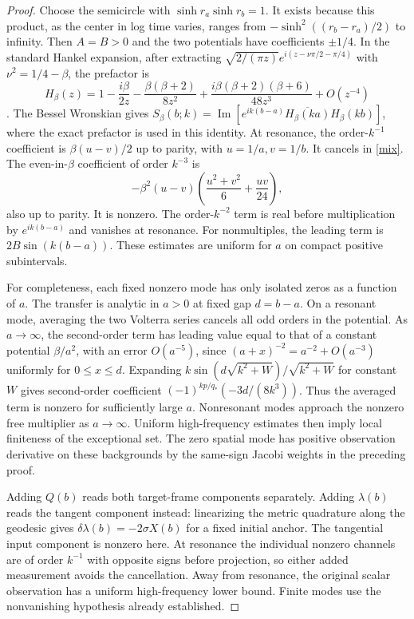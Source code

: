 \documentclass[11pt]{article}
\begin{document}
\begin{proof}
Choose the semicircle with $\sinh r_a\sinh r_b=1$.
It exists because this product, as the center in log time varies,
ranges from $-\sinh^2((r_b-r_a)/2)$ to infinity.
Then $A=B>0$ and the two potentials have coefficients $\pm1/4$.
In the standard Hankel expansion, after extracting
$\sqrt{2/(\pi z)}e^{i(z-\nu\pi/2-\pi/4)}$ with
$\nu^2=1/4-\beta$, the prefactor is
\[
 H_\beta(z)
 =1-\frac{i\beta}{2z}-\frac{\beta(\beta+2)}{8z^2}
       +\frac{i\beta(\beta+2)(\beta+6)}{48z^3}+O(z^{-4})
\]
\cite[\S 10.17]{dlmf}. The Bessel Wronskian gives
$S_\beta(b;k)=\operatorname{Im}
[e^{ik(b-a)}\overline{H_\beta(ka)}H_\beta(kb)]$,
where the exact prefactor is used in this identity.
At resonance, the order-$k^{-1}$ coefficient is
$\beta(u-v)/2$ up to parity, with $u=1/a,v=1/b$.
It cancels in \eqref{mix}. The even-in-$\beta$ coefficient
of order $k^{-3}$ is
\begin{equation}
 -\beta^2(u-v)\left(\frac{u^2+v^2}{6}+\frac{uv}{24}\right),
 \label{coefficient}
\end{equation}
also up to parity. It is nonzero. The order-$k^{-2}$ term is real
before multiplication by $e^{ik(b-a)}$ and vanishes at resonance.
For nonmultiples, the leading term is $2B\sin(k(b-a))$.
These estimates are uniform for $a$ on compact positive subintervals.

For completeness, each fixed nonzero mode has only isolated zeros
as a function of $a$. The transfer is analytic in $a>0$ at fixed
gap $d=b-a$. On a resonant mode, averaging the two Volterra
series cancels all odd orders in the potential. As $a\to\infty$,
the second-order term has leading value equal to that of a constant
potential $\beta/a^2$, with an error $O(a^{-5})$, since
$(a+x)^{-2}=a^{-2}+O(a^{-3})$ uniformly for $0\le x\le d$.
Expanding $k\sin(d\sqrt{k^2+W})/\sqrt{k^2+W}$ for constant $W$
gives second-order coefficient $(-1)^{kp/q_*}(-3d/(8k^3))$.
Thus the averaged term is nonzero for sufficiently large $a$.
Nonresonant modes approach the nonzero free multiplier as
$a\to\infty$. Uniform high-frequency estimates then imply local
finiteness of the exceptional set. The zero spatial mode has
positive observation derivative on these backgrounds by the
same-sign Jacobi weights in the preceding proof.

Adding $Q(b)$ reads both target-frame components separately.
Adding $\lambda(b)$ reads the tangent component instead:
linearizing the metric quadrature along the geodesic gives
$\delta\lambda(b)=-2\sigma X(b)$ for a fixed initial anchor.
The tangential input component is nonzero here.
At resonance the individual nonzero channels are of order
$k^{-1}$ with opposite signs before projection, so either added
measurement avoids the cancellation.
Away from resonance, the original scalar observation has a
uniform high-frequency lower bound. Finite modes use the
nonvanishing hypothesis already established.
\end{proof}
\end{document}
